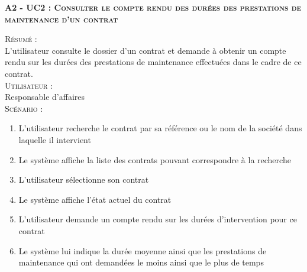 \noindent\textsc{\bf{A2 - UC2 :} Consulter le compte rendu des durées des prestations de maintenance d’un contrat}
\begin{shaded}
\noindent\textsc{Résumé :}\\

L’utilisateur consulte le dossier d’un contrat et demande à obtenir un compte rendu sur les durées des prestations de maintenance effectuées dans le cadre de ce contrat. \\

\noindent\textsc{Utilisateur :}\\

Responsable d’affaires \\

\noindent\textsc{Scénario :} \\
\begin{enumerate}
    \item L’utilisateur recherche le contrat par sa référence ou le nom de la société dans laquelle il intervient
    \item Le système affiche la liste des contrats pouvant correspondre à la recherche
    \item L’utilisateur sélectionne son contrat
    \item Le système affiche l’état actuel du contrat
    \item L’utilisateur demande un compte rendu sur les durées d’intervention pour ce contrat
    \item Le système lui indique la durée moyenne ainsi que les prestations de maintenance qui ont demandées le moins ainsi que le plus de temps
\end{enumerate}
\end{shaded}

